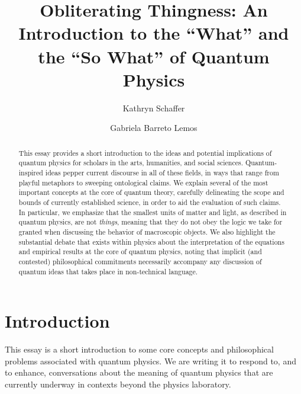 \documentclass[onecolumn,preprintnumbers,amsmath,amssymbn,reprint,nofootinbib,superscriptaddress]{revtex4}    %
\begin{document}
\title{Obliterating Thingness: An Introduction to the ``What'' and the ``So What'' of Quantum Physics}

\author{Kathryn Schaffer}

\author{Gabriela Barreto Lemos}



\begin{abstract}
This essay provides a short introduction to the ideas and potential implications of quantum physics for scholars in the arts, humanities, and social sciences.  Quantum-inspired ideas pepper current discourse in all of these fields, in ways that range from playful metaphors to sweeping ontological claims.  We explain several of the most important concepts at the core of quantum theory, carefully delineating the scope and bounds of currently established science, in order to aid the evaluation of such claims.  In particular, we emphasize that the smallest units of matter and light, as described in quantum physics, are not {\em things}, meaning that they do not obey the logic we take for granted when discussing the behavior of macroscopic objects.  We also highlight the substantial debate that exists within physics about the interpretation of the equations and empirical results at the core of quantum physics, noting that implicit (and contested) philosophical commitments necessarily accompany any discussion of quantum ideas that takes place in non-technical language.
\end{abstract}
\maketitle
\section{Introduction}
\label{intro}
This essay is a short introduction to some core concepts and philosophical problems associated with quantum physics. We are writing it to respond to, and to enhance, conversations about the meaning of quantum physics that are currently underway in contexts beyond the physics laboratory.  
\end{document}
